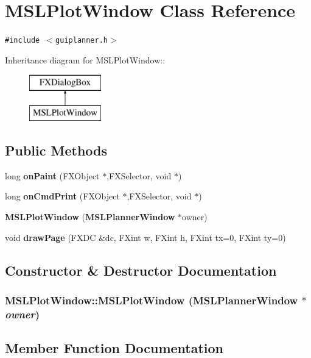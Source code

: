 \section{MSLPlot\-Window  Class Reference}
\label{classMSLPlotWindow}
{\tt \#include $<$guiplanner.h$>$}

Inheritance diagram for MSLPlot\-Window::\begin{figure}[H]
\begin{center}
\leavevmode
\includegraphics[height=2cm]{classMSLPlotWindow}
\end{center}
\end{figure}
\subsection*{Public Methods}
\begin{CompactItemize}
\item 
long {\bf on\-Paint} (FXObject $\ast$,FXSelector, void $\ast$)
\item 
long {\bf on\-Cmd\-Print} (FXObject $\ast$,FXSelector, void $\ast$)
\item 
{\bf MSLPlot\-Window} ({\bf MSLPlanner\-Window} $\ast$owner)
\item 
void {\bf draw\-Page} (FXDC \&dc, FXint w, FXint h, FXint tx=0, FXint ty=0)
\end{CompactItemize}


\subsection{Constructor \& Destructor Documentation}
\subsubsection{\setlength{\rightskip}{0pt plus 5cm}MSLPlot\-Window::MSLPlot\-Window ({\bf MSLPlanner\-Window} $\ast$ {\em owner})}\label{classMSLPlotWindow_a2}




\subsection{Member Function Documentation}
